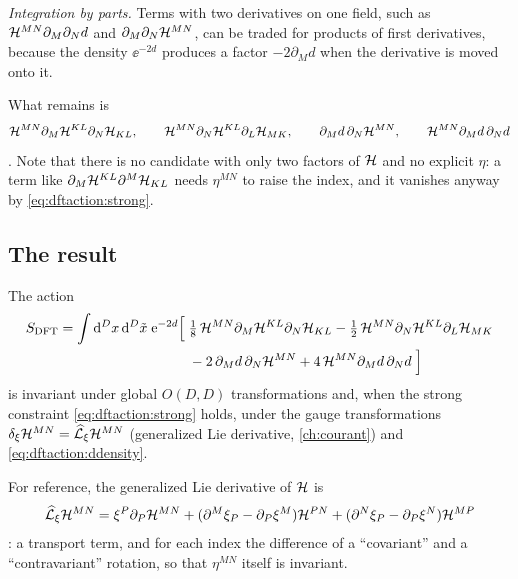\emph{Integration by parts.} Terms with two derivatives on one field, such as
$\mathcal{H}^{MN}\partial_M\partial_Nd$ and $\partial_M\partial_N\mathcal{H}^{MN}$, can be traded for products
of first derivatives, because the density $\ee^{-2d}$ produces a factor $-2\partial_Md$ when the
derivative is moved onto it.

What remains is
\begin{equation}\label{eq:dftaction:candidates}
\mathcal{H}^{MN}\partial_M\mathcal{H}^{KL}\partial_N\mathcal{H}_{KL},\qquad
\mathcal{H}^{MN}\partial_N\mathcal{H}^{KL}\partial_L\mathcal{H}_{MK},\qquad
\partial_Md\,\partial_N\mathcal{H}^{MN},\qquad
\mathcal{H}^{MN}\partial_Md\,\partial_Nd
\end{equation}
. Note that there is no candidate with only
two factors of $\mathcal{H}$ and no explicit $\eta$: a term like $\partial_M\mathcal{H}^{KL}\partial^M\mathcal{H}_{KL}$
needs $\eta^{MN}$ to raise the index, and it vanishes anyway by \eqref{eq:dftaction:strong}.

\subsection{The result}

\begin{theorem}\label{thm:dftaction:action}
The action
\begin{equation}\label{eq:dftaction:S}
\begin{aligned}
S_{\text{DFT}}=\int\mathrm{d}^Dx\,\mathrm{d}^D\tilde x\;\mathrm{e}^{-2d}\Bigl[\;&\tfrac18\,\mathcal{H}^{MN}\partial_M\mathcal{H}^{KL}
\partial_N\mathcal{H}_{KL}-\tfrac12\,\mathcal{H}^{MN}\partial_N\mathcal{H}^{KL}\partial_L\mathcal{H}_{MK}\\
&-2\,\partial_Md\,\partial_N\mathcal{H}^{MN}+4\,\mathcal{H}^{MN}\partial_Md\,\partial_Nd\;\Bigr]
\end{aligned}
\end{equation}
is invariant under global $O(D,D)$ transformations and, when the strong constraint
\eqref{eq:dftaction:strong} holds, under the gauge transformations
$\delta_\xi\mathcal{H}^{MN}=\widehat{\mathcal L}_\xi\mathcal{H}^{MN}$ (generalized Lie derivative,
\cref{ch:courant}) and \eqref{eq:dftaction:ddensity}. \TL
{}
\end{theorem}

For reference, the generalized Lie derivative of $\mathcal{H}$ is
\begin{equation}\label{eq:dftaction:genlie}
\widehat{\mathcal L}_\xi\mathcal{H}^{MN}=\xi^P\partial_P\mathcal{H}^{MN}+(\partial^M\xi_P-\partial_P\xi^M)\mathcal{H}^{PN}
+(\partial^N\xi_P-\partial_P\xi^N)\mathcal{H}^{MP}
\end{equation}
: a transport term, and for each index the
difference of a ``covariant'' and a ``contravariant'' rotation, so that $\eta^{MN}$ itself is
invariant.


